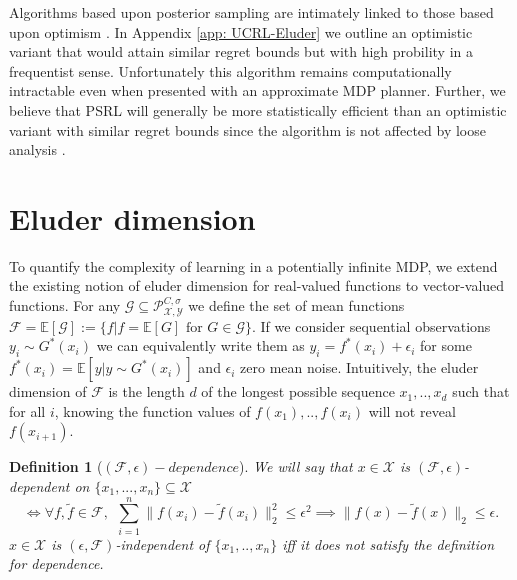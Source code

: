 \documentclass{article}
\newtheorem{mydef}{Definition}
\newcommand{\Exp}{\mathds{E}}
\newcommand{\Xc}{\mathcal{X}}
\newcommand{\Yc}{\mathcal{Y}}
\newcommand{\Pc}{\mathcal{P}}
\newcommand{\Fc}{\mathcal{F}}
\newcommand{\Gc}{\mathcal{G}}
\begin{document}
Algorithms based upon posterior sampling are intimately linked to those based upon optimism \cite{russo2013}.
In Appendix \ref{app: UCRL-Eluder} we outline an optimistic variant that would attain similar regret bounds but with high probility in a frequentist sense.
Unfortunately this algorithm remains computationally intractable even when presented with an approximate MDP planner.
Further, we believe that PSRL will generally be more statistically efficient than an optimistic variant with similar regret bounds since the algorithm is not affected by loose analysis \cite{osband2013more}.


\section{Eluder dimension}
\label{sec: eluder}
To quantify the complexity of learning in a potentially infinite MDP, we extend the existing notion of eluder dimension for real-valued functions \cite{russo2013eluder} to vector-valued functions.
For any $\Gc \subseteq \Pc^{C,\sigma}_{\Xc,\Yc}$ we define the set of mean functions $\Fc = \Exp[\Gc] := \{f | f=\Exp[G] \text{ for } G \in \Gc \}$.
If we consider sequential observations $y_i \sim G^*(x_i)$ we can equivalently write them as $y_i = f^*(x_i) + \epsilon_i$ for some $f^*(x_i) = \Exp[y | y \sim G^*(x_i)]$ and $\epsilon_i$ zero mean noise.
Intuitively, the eluder dimension of $\Fc$ is the length $d$ of the longest possible sequence $x_1,..,x_d$ such that for all $i$, knowing the function values of $f(x_1),..,f(x_i)$ will not reveal $f(x_{i+1})$.

\begin{mydef}[$ (\mathcal{F},\epsilon)-dependence$]
\hspace{0.00000000000001mm} \newline
We will say that $x \in \mathcal{X}$ is $(\Fc,\epsilon)$-dependent on $\{x_1,...,x_n\} \subseteq \Xc $
$$ \iff \forall f,\tilde{f} \in \Fc, \ \ \sum_{i=1}^{n} \| f(x_i) - \tilde{f}(x_i) \|_2^2 \le \epsilon^2 \implies \| f(x) - \tilde{f}(x)\|_2 \le \epsilon.$$
$x \in \mathcal{X}$ is $(\epsilon,\mathcal{F})$-independent of $\{x_1,..,x_n\}$ iff it does not satisfy the definition for dependence.
\end{mydef}
\end{document}
